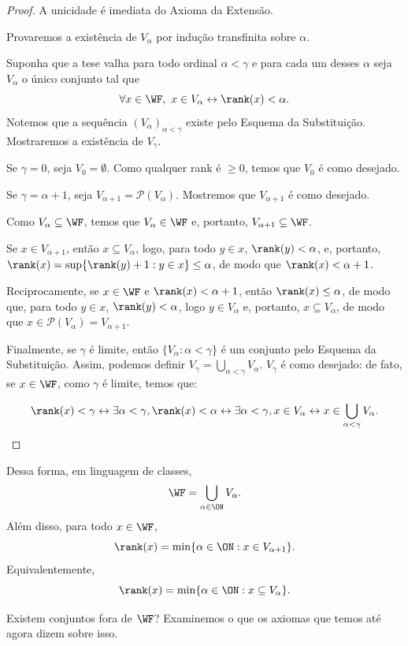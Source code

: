\begin{proof}
    A unicidade é imediata do Axioma da Extensão.

    Provaremos a existência de $V_\alpha$ por indução transfinita sobre $\alpha$.

    Suponha que a tese valha para todo ordinal $\alpha<\gamma$ e para cada um desses $\alpha$ seja $V_\alpha$ o único conjunto tal que
    \[
        \forall x\in \WF,\ x\in V_\alpha \leftrightarrow \rank(x)<\alpha.
    \]
    Notemos que a sequência $(V_\alpha)_{\alpha<\gamma}$ existe pelo Esquema da Substituição.
    Mostraremos a existência de $V_\gamma$.

    Se $\gamma=0$, seja $V_0=\emptyset$.
    Como qualquer rank é $\geq 0$, temos que $V_0$ é como desejado.

    Se $\gamma=\alpha+1$, seja $V_{\alpha+1}=\mathcal P(V_\alpha)$.
    Mostremos que $V_{\alpha+1}$ é como desejado.

    Como $V_\alpha\subseteq \WF$, temos que $V_{\alpha}\in \WF$ e, portanto, $V_{\alpha+1}\subseteq \WF$.

    Se $x\in V_{\alpha+1}$, então $x\subseteq V_\alpha$, logo, para todo $y\in x$, $\rank(y)<\alpha$, e, portanto, $\rank(x)=\sup\{\rank(y)+1: y\in x\}\leq \alpha$, de modo que $\rank(x)<\alpha+1$.

    Reciprocamente, se $x \in \WF$ e $\rank(x)<\alpha+1$, então $\rank(x)\leq \alpha$, de modo que, para todo $y\in x$, $\rank(y)<\alpha$, logo $y\in V_\alpha$ e, portanto, $x\subseteq V_\alpha$, de modo que $x\in \mathcal P(V_\alpha)=V_{\alpha+1}$.

    Finalmente, se $\gamma$ é limite, então $\{V_\alpha: \alpha<\gamma\}$ é um conjunto pelo Esquema da Substituição.
    Assim, podemos definir $V_\gamma=\bigcup_{\alpha<\gamma} V_\alpha$.
    $V_\gamma$ é como desejado: de fato, se $x\in \WF$, como $\gamma$ é limite, temos que:

    \[
        \rank(x)<\gamma \leftrightarrow \exists \alpha<\gamma, \rank(x)<\alpha \leftrightarrow \exists \alpha<\gamma, x\in V_\alpha \leftrightarrow x\in \bigcup_{\alpha<\gamma} V_\alpha.
    \]
\end{proof}

Dessa forma, em linguagem de classes,
\[
    \WF=\bigcup_{\alpha\in \ON} V_\alpha.
\]
Além disso, para todo $x\in\WF$,
\[
    \rank(x)=\min\{\alpha\in \ON: x\in V_{\alpha+1}\}.
\]
Equivalentemente,
\[
    \rank(x)=\min\{\alpha\in \ON: x\subseteq V_\alpha\}.
\]

Existem conjuntos fora de $\WF$?
Examinemos o que os axiomas que temos até agora dizem sobre isso.

